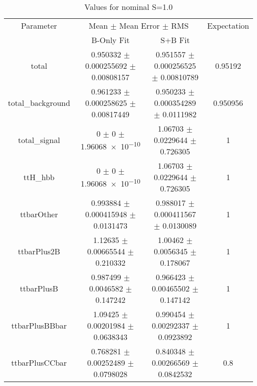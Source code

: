 \begin{table}
\centering
\caption{Values for nominal S=1.0}
\begin{tabular}{cccc}
\toprule
Parameter & \multicolumn{2}{c}{Mean $\pm$ Mean Error $\pm$ RMS} & Expectation\\
 & B-Only Fit & S+B Fit & \\
\midrule
total & \num{0.950332} $\pm$ \num{0.000255692} $\pm$ \num{0.00808157} & \num{0.951557} $\pm$ \num{0.000256525} $\pm$ \num{0.00810789} & \num{0.95192}\\
total\_background & \num{0.961233} $\pm$ \num{0.000258625} $\pm$ \num{0.00817449} & \num{0.950233} $\pm$ \num{0.000354289} $\pm$ \num{0.0111982} & \num{0.950956}\\
total\_signal & \num{0} $\pm$ \num{0} $\pm$ \num{1.96068e-10} & \num{1.06703} $\pm$ \num{0.0229644} $\pm$ \num{0.726305} & \num{1}\\
ttH\_hbb & \num{0} $\pm$ \num{0} $\pm$ \num{1.96068e-10} & \num{1.06703} $\pm$ \num{0.0229644} $\pm$ \num{0.726305} & \num{1}\\
ttbarOther & \num{0.993884} $\pm$ \num{0.000415948} $\pm$ \num{0.0131473} & \num{0.988017} $\pm$ \num{0.000411567} $\pm$ \num{0.0130089} & \num{1}\\
ttbarPlus2B & \num{1.12635} $\pm$ \num{0.00665544} $\pm$ \num{0.210332} & \num{1.00462} $\pm$ \num{0.0056345} $\pm$ \num{0.178067} & \num{1}\\
ttbarPlusB & \num{0.987499} $\pm$ \num{0.0046582} $\pm$ \num{0.147242} & \num{0.966423} $\pm$ \num{0.00465502} $\pm$ \num{0.147142} & \num{1}\\
ttbarPlusBBbar & \num{1.09425} $\pm$ \num{0.00201984} $\pm$ \num{0.0638343} & \num{0.990454} $\pm$ \num{0.00292337} $\pm$ \num{0.0923892} & \num{1}\\
ttbarPlusCCbar & \num{0.768281} $\pm$ \num{0.00252489} $\pm$ \num{0.0798028} & \num{0.840348} $\pm$ \num{0.00266569} $\pm$ \num{0.0842532} & \num{0.8}\\
\bottomrule
\end{tabular}
\end{table}